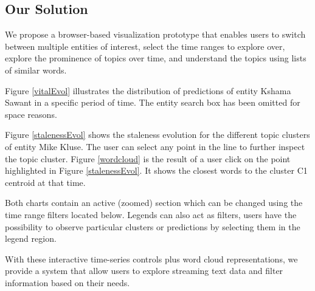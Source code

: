 \documentclass{article}
\begin{document}
\subsection{Our Solution}

We propose a browser-based visualization prototype that enables users to switch between multiple entities of interest, select the time ranges to explore over, explore the prominence of topics over time, and understand the topics using lists of similar words.


Figure \ref{vitalEvol} illustrates the distribution of predictions of entity Kshama Sawant in a specific period of time. The entity search box has been omitted for space reasons.

Figure \ref{stalenessEvol} shows the staleness evolution for the different topic clusters of entity Mike Kluse. The user can select any point in the line to further inspect the topic cluster. Figure \ref{wordcloud} is the result of a user click on the point highlighted in Figure \ref{stalenessEvol}. It shows the closest words to the cluster C1 centroid at that time.

Both charts contain an active (zoomed) section which can be changed using the time range filters located below. Legends can also act as filters, users have the possibility to observe particular clusters or predictions by selecting them in the legend region.

With these interactive time-series controls plus word cloud representations, we provide a system that allow users to explore streaming text data and filter information based on their needs.
\end{document}
